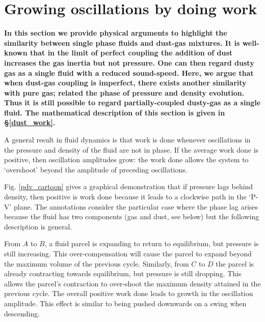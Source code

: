 \documentclass[iop, numberedappendix]{emulateapj}
\begin{document}
\section{Growing oscillations by doing work}\label{grow_osc}
{\bf
In this section we provide physical arguments to highlight the
similarity between single phase fluids and dust-gas mixtures. It is
well-known that in the limit of perfect coupling the addition of dust
increases the gas inertia but not pressure. One can then regard 
dusty gas as a single fluid with a reduced sound-speed. Here, we
argue that when dust-gas coupling is imperfect, there exists another
similarity with pure gas; related the phase of pressure and density
evolution. Thus it is still possible to regard
partially-coupled dusty-gas as a single fluid. The mathematical
description of this section is given in \S\ref{dust_work}.   
}

A general result in fluid dynamics is that work is done whenever
oscillations in the pressure and density of the fluid are not in
phase. If  the average work done is positive, then oscillation
amplitudes grow: the work done allows the system to `overshoot' beyond 
the amplitude of preceding oscillations.   


Fig. \ref{pdv_cartoon} gives a graphical demonstration that 
if pressure lags behind density, then positive is work done 
because it leads to a clockwise path in the 
`P-V' plane. The annotations consider the particular case where the
phase lag arises because the fluid has two components (gas and dust,
see below) but the following description is general. 

From $A$ to $B$, a fluid parcel is expanding to return to 
equilibrium, but pressure is still 
increasing. This over-compensation will cause the parcel to expand
beyond the maximum volume of the previous cycle. 
Similarly, from $C$ to $D$ the parcel is already contracting towards
equilibrium, but pressure 
is still dropping. This allows the  
parcel's contraction to over-shoot the maximum density attained in the
previous cycle. 
The overall positive work done leads to growth in the oscillation amplitude. 
This effect is similar to being pushed downwards on a swing when 
descending.
\end{document}
